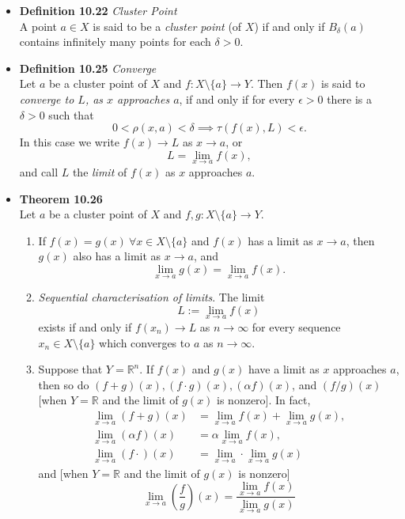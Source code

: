 \documentclass[11pt,a4paper]{article}
\begin{document}
\begin{itemize}
    \item \textbf{Definition 10.22} \emph{Cluster Point} \\
        A point $a \in X$ is said to be a \emph{cluster point} (of $X$) if and only if
        $B_\delta (a)$ contains infinitely many points for each $\delta > 0$.

    \item \textbf{Definition 10.25} \emph{Converge} \\
        Let $a$ be a cluster point of $X$ and $f : X \setminus \{a\} \to Y$.
        Then $f(x)$ is said to \emph{converge to $L$, as $x$ approaches $a$},
        if and only if for every $\epsilon > 0$ there is a $\delta > 0$ such that
        \[
            0 < \rho (x, a) < \delta \implies \tau (f(x), L) < \epsilon.
        \]
        In this case we write $f(x) \to L$ as $x \to a$, or
        \[
            L = \lim_{x \to a} f(x),
        \]
        and call $L$ the \emph{limit} of $f(x)$ as $x$ approaches $a$.

    \item \textbf{Theorem 10.26} \\
        Let $a$ be a cluster point of $X$ and $f, g : X \setminus \{a\} \to Y$.
        \begin{enumerate}
            \item If $f(x) = g(x) \ \forall x \in X \setminus \{a\}$ and $f(x)$ has a limit
                as $x \to a$, then $g(x)$ also has a limit as $x \to a$, and
                \[
                    \lim_{x \to a} g(x) = \lim_{x \to a} f(x).
                \]

            \item \emph{Sequential characterisation of limits}.
                The limit
                \[
                    L := \lim_{x \to a} f(x)
                \]
                exists if and only if $f(x_n) \to L$ as $n \to \infty$ for every sequence
                $x_n \in X \setminus \{a\}$ which converges to $a$ as $n \to \infty$.

            \item Suppose that $Y = \mathbb{R}^n$.
                If $f(x)$ and $g(x)$ have a limit as $x$ approaches $a$, then so do
                $(f+g)(x), (f \cdot g)(x), (\alpha f)(x)$, and $(f/g)(x)$
                [when $Y = \mathbb{R}$ and the limit of $g(x)$ is nonzero].
                In fact,
                \begin{align*}
                    \lim_{x \to a} (f+g)(x) &= \lim_{x \to a} f(x) + \lim_{x \to a} g(x), \\
                    \lim_{x \to a} (\alpha f) (x) &= \alpha \lim_{x \to a} f(x), \\
                    \lim_{x \to a} (f \cdot ) (x) &= \lim_{x \to a} \cdot \lim_{x \to a} g(x)
                \end{align*}
                and [when $Y = \mathbb{R}$ and the limit of $g(x)$ is nonzero]
                \[
                    \lim_{x \to a} \left( \frac{f}{g} \right) (x) =
                    \frac{\lim_{x \to a} f(x)}{\lim_{x \to a} g(x)}
                \]


\end{enumerate}
\end{itemize}
\end{document}
